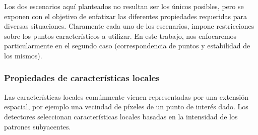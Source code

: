Los dos escenarios aquí planteados no resultan ser los únicos posibles, pero se exponen con el objetivo de enfatizar las diferentes propiedades requeridas para diversas situaciones. Claramente cada uno de los escenarios, impone restricciones sobre los puntos característicos a utilizar. En este trabajo, nos enfocaremos particularmente en el segundo caso (correspondencia de puntos y estabilidad de los mismos).
% 
% 
\subsubsection{Propiedades de características locales}
Las características locales comúnmente vienen representadas por una extensión espacial, por ejemplo una vecindad de píxeles de un punto de interés dado. Los detectores seleccionan características locales basadas en la intensidad de los patrones subyacentes.

